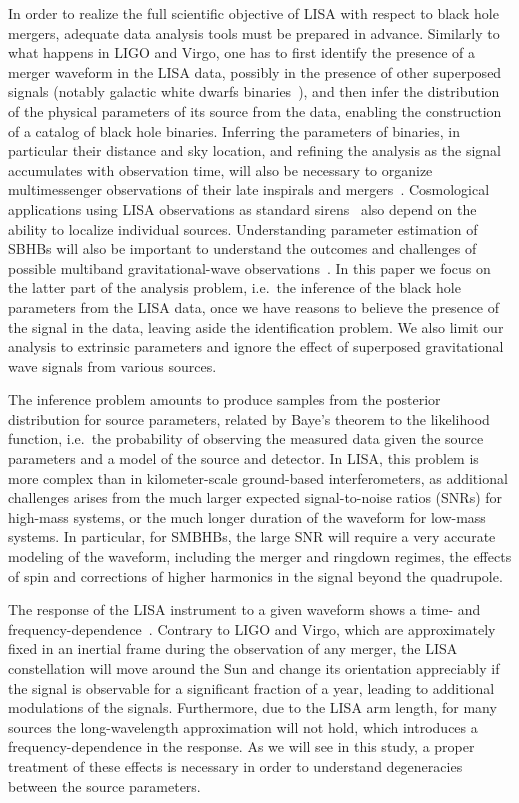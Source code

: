 \documentclass[aps,showpacs,twocolumn,prd,superscriptaddress,nofootinbib]{revtex4-1}
\begin{document}
In order to realize the full scientific objective of LISA with respect to black hole mergers, adequate data analysis tools must be prepared in advance. Similarly to what happens in LIGO and Virgo, one has to first identify the presence of a merger waveform in the LISA data, possibly in the presence of other superposed signals (notably galactic white dwarfs binaries~\cite{Nelemans+01}), and then infer the distribution of the physical parameters of its source from the data, enabling the construction of a catalog of black hole binaries. Inferring the parameters of binaries, in particular their distance and sky location, and refining the analysis as the signal accumulates with observation time, will also be necessary to organize multimessenger observations of their late inspirals and mergers~\cite{ArmitageNatarajan02, DalCanton+19}. Cosmological applications using LISA observations as standard sirens~\cite{Schutz86, Tamanini+16} also depend on the ability to localize individual sources. Understanding parameter estimation of SBHBs will also be important to understand the outcomes and challenges of possible multiband gravitational-wave observations~\cite{Sesana16}. In this paper we focus on the latter part of the analysis problem, i.e.~the inference of the black hole parameters from the LISA data, once we have reasons to believe the presence of the signal in the data, leaving aside the identification problem. We also limit our analysis to extrinsic parameters and ignore the effect of superposed gravitational wave signals from various sources.

The inference problem amounts to produce samples from the posterior distribution for source parameters, related by Baye's theorem to the likelihood function, i.e.~the probability of observing the measured data given the source parameters and a model of the source and detector. In LISA, this problem is more complex than in kilometer-scale ground-based interferometers, as additional challenges arises from the much larger expected signal-to-noise ratios (SNRs) for high-mass systems, or the much longer duration of the waveform for low-mass systems. In particular, for SMBHBs, the large SNR will require a very accurate modeling of the waveform, including the merger and ringdown regimes, the effects of spin and corrections of higher harmonics in the signal beyond the quadrupole.

The response of the LISA instrument to a given waveform shows a time- and frequency-dependence~\cite{Cutler97, Larson+99, CR02, MB18}.
Contrary to LIGO and Virgo, which are approximately fixed in an inertial frame during the observation of any merger, the LISA constellation will move around the Sun and change its orientation appreciably if the signal is observable for a significant fraction of a year, leading to additional modulations of the signals. Furthermore, due to the LISA arm length, for many sources the long-wavelength approximation will not hold, which introduces a frequency-dependence in the response. As we will see in this study, a proper treatment of these effects is necessary in order to understand degeneracies between the source parameters.
\end{document}

